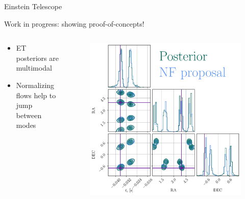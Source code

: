 \documentclass[usenames,dvipsnames,t]{beamer}
\begin{document}
\begin{frame}{Einstein Telescope}

  \def\x{4mm}

  \begin{tcolorbox}[colback=red!10!white, colframe=red!80!black, coltext=black]
  Work in progress: showing proof-of-concepts!
  \end{tcolorbox}

  \pause
  \vspace{2mm}

  \begin{columns}
    \begin{column}[t]{0.50\linewidth}
      \begin{itemize}
        \item ET posteriors are multimodal

        \vspace{\x}
        
        \item Normalizing flows help to jump between modes
      \end{itemize}
    \end{column}

    \begin{column}[t]{0.49\linewidth}
      \begin{figure}
        \centering
        \includegraphics[width=0.90\linewidth]{Figures/corner_plot.pdf}
      \end{figure}
    \end{column}
  \end{columns}
\end{frame}
\end{document}
